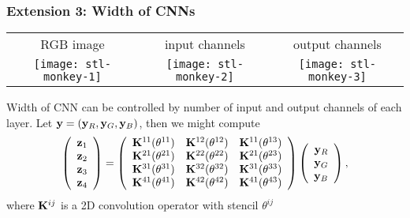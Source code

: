 \documentclass[12pt,fleqn,handout]{beamer}
\begin{document}
\begin{frame}\frametitle{Extension 3: Width of CNNs}
	
	\begin{center}
		\begin{tabular}{ccc}
			RGB image & input channels & output channels\\ 
			\texttt{[image: stl-monkey-1]}
			&
			\texttt{[image: stl-monkey-2]}
			&
			\texttt{[image: stl-monkey-3]}
		\end{tabular}
	\end{center}
	
	Width of CNN can be controlled by number of input and output channels of each layer. Let ${\bf y} = ({\bf y}_R, {\bf y}_G, {\bf y}_B)$, then we might compute
	$$
		\left(
			\begin{array}{r}
				{\bf z}_1 \\
				{\bf z}_2 \\
				{\bf z}_3 \\
				{\bf z}_4
			\end{array}
		\right)
		= 
		\left(
		\begin{array}{rrr}
			{\bf K}^{11}(\theta^{11}) &  {\bf K}^{12}(\theta^{12}) & {\bf K}^{11}(\theta^{13})\\
			{\bf K}^{21}(\theta^{21}) &  {\bf K}^{22}(\theta^{22}) & {\bf K}^{21}(\theta^{23})\\
			{\bf K}^{31}(\theta^{31}) &  {\bf K}^{32}(\theta^{32}) & {\bf K}^{31}(\theta^{33})\\
			{\bf K}^{41}(\theta^{41}) &  {\bf K}^{42}(\theta^{42}) & {\bf K}^{41}(\theta^{43})\\
		\end{array}
		\right)
		\left(
			\begin{array}{r}
				{\bf y}_R \\
				{\bf y}_G \\
				{\bf y}_B 
			\end{array}
		\right),
	$$
	where ${\bf K}^{ij}$ is a 2D convolution operator with stencil $\theta^{ij}$
	
\end{frame}
\end{document}
